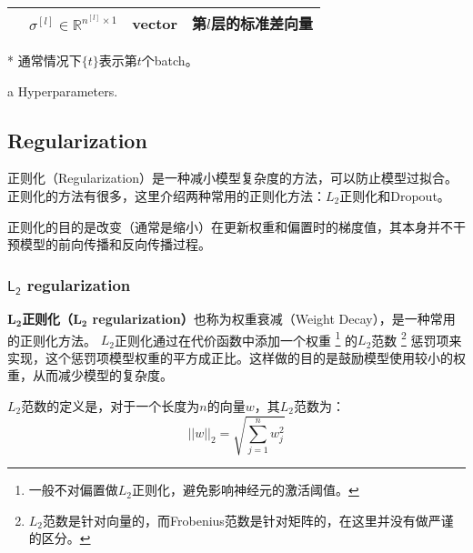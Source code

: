 \begin{table}[h!tbp]
\begin{threeparttable}
\begin{tabular}{clcc}
                                        & $\sigma^{[l]} \in \mathbb{R}^{n^{[l]} \times 1}$                                      & vector               & 第$l$层的标准差向量                                                     \\
        \bottomrule
    \end{tabular}
    \label{tab:notations-chap2} %
    \begin{tablenotes}
        \item[*] 通常情况下${\{t\}}$表示第$t$个batch。
        \item[a] Hyperparameters.
    \end{tablenotes}
    \end{threeparttable}
\end{table}

\subsection{Regularization}

正则化（Regularization）是一种减小模型复杂度的方法，可以防止模型过拟合。
正则化的方法有很多，这里介绍两种常用的正则化方法：$L_2$正则化和Dropout。

\begin{hint}
    正则化的目的是改变（通常是缩小）在更新权重和偏置时的梯度值，其本身并不干预模型的前向传播和反向传播过程。
\end{hint}

\subsubsection{$\mathsf{L_2}$ regularization}

\textbf{$\bm{L_2}$正则化（$\bm{L_2}$ regularization）}也称为权重衰减（Weight Decay），是一种常用的正则化方法。
$L_2$正则化通过在代价函数中添加一个权重
\footnote{一般不对偏置做$L_2$正则化，避免影响神经元的激活阈值。}
的$L_2$范数
\footnote{$L_2$范数是针对向量的，而Frobenius范数是针对矩阵的，在这里并没有做严谨的区分。}
惩罚项来实现，这个惩罚项模型权重的平方成正比。这样做的目的是鼓励模型使用较小的权重，从而减少模型的复杂度。

$L_2$范数的定义是，对于一个长度为$n$的向量$w$，其$L_2$范数为：
\begin{equation}
    ||w||_2 = \sqrt{\sum_{j=1}^nw_j^2}
\end{equation}

